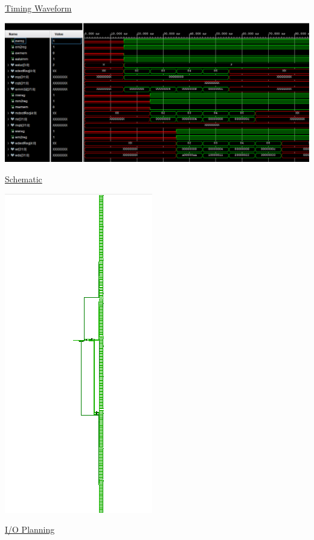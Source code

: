 \documentclass[11pt]{article}
\begin{document}
\begin{center}
    \underline{Timing Waveform}

    \includegraphics[width = 1\textwidth]{TimingDiag.png}
    
    \newpage

    \underline{Schematic}

    \includegraphics[scale = 1]{Design.png}

    \newpage

    \underline{I/O Planning}


\end{center}
\end{document}
